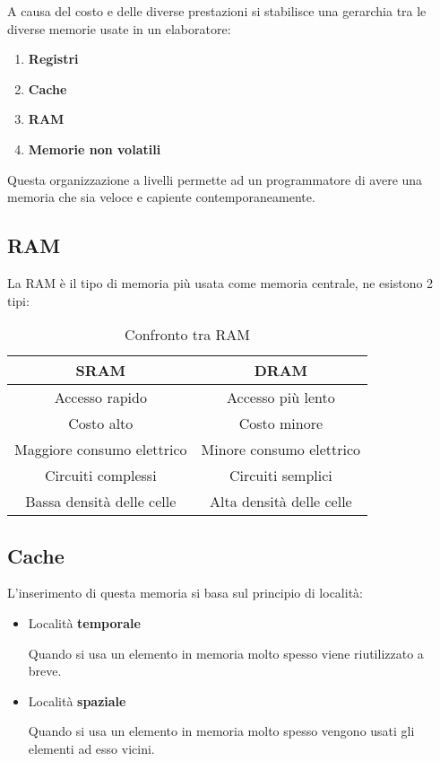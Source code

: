 \documentclass{article}
\begin{document}
A causa del costo e delle diverse prestazioni si stabilisce una gerarchia tra le diverse memorie usate in un elaboratore:
\begin{enumerate}
    \item \textbf{Registri}
    \item \textbf{Cache}
    \item \textbf{RAM}
    \item \textbf{Memorie non volatili}\newline
\end{enumerate}

\noindent Questa organizzazione a livelli permette ad un programmatore di avere una memoria che sia veloce e capiente contemporaneamente.\newline

\subsection{RAM}

La RAM è il tipo di memoria più usata come memoria centrale, ne esistono 2 tipi:


\begin{table}[ht]
    \centering
    \begin{tabular}{c|c}
          \textbf{SRAM} & \textbf{DRAM}\\
          \hline
          Accesso rapido & Accesso più lento\\
          \hline
          Costo alto & Costo minore\\
          \hline
          Maggiore consumo elettrico & Minore consumo elettrico\\
          \hline
          Circuiti complessi & Circuiti semplici\\
          \hline
          Bassa densità delle celle & Alta densità delle celle\\
    \end{tabular}
    \caption{Confronto tra RAM}
    \label{tab:ram}
\end{table}

\subsection{Cache}

L'inserimento di questa memoria si basa sul principio di località:
\begin{itemize}
    \item Località \textbf{temporale}

        Quando si usa un elemento in memoria molto spesso viene riutilizzato a breve.

    \item Località \textbf{spaziale}

        Quando si usa un elemento in memoria molto spesso vengono usati gli elementi ad esso vicini.\newline
    
\end{itemize}
\end{document}
